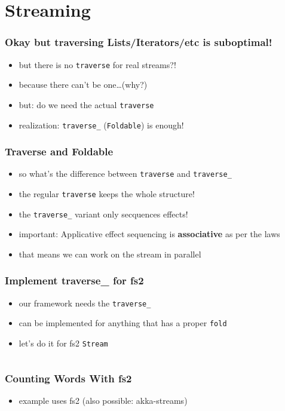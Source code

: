 \documentclass[aspectratio=169]{beamer}
\begin{document}
\section{Streaming}\label{sec:streaming}

\begin{frame}
  \frametitle{Okay but traversing Lists/Iterators/etc is suboptimal!}
  \begin{itemize}
  \item but there is no \texttt{traverse} for real streams?!
  \item because there can't be one\ldots (why?)
  \item but: do we need the actual \texttt{traverse}
  \item realization: \texttt{traverse\_} (\texttt{Foldable}) is enough!
  \end{itemize}
\end{frame}

\begin{frame}
  \frametitle{Traverse and Foldable}
  \begin{itemize}
  \item so what's the difference between \texttt{traverse} and \texttt{traverse\_}
  \item the regular \texttt{traverse} keeps the whole structure!
  \item the \texttt{traverse\_} variant only secquences effects!
  \item important: Applicative effect sequencing is \textbf{associative} as per the laws
  \item that means we can work on the stream in parallel
  \end{itemize}
\end{frame}

\begin{frame}[fragile]
  \frametitle{Implement traverse\_ for fs2}
  \begin{itemize}
  \item our framework needs the \texttt{traverse\_}
  \item can be implemented for anything that has a proper \texttt{fold}
  \item let's do it for fs2 \texttt{Stream}
  \end{itemize}
  \vspace{1cm}
  \inputminted[fontsize=\small]{scala}{snippets/fs2-traverse-stream.scala}
\end{frame}

\begin{frame}[fragile]
  \frametitle{Counting Words With fs2}
  \begin{itemize}
  \item example uses fs2 (also possible: akka-streams)
  \end{itemize}
  \vspace{1cm}
  \inputminted[fontsize=\small]{scala}{snippets/fs2-count-words.scala}
\end{frame}
\end{document}

